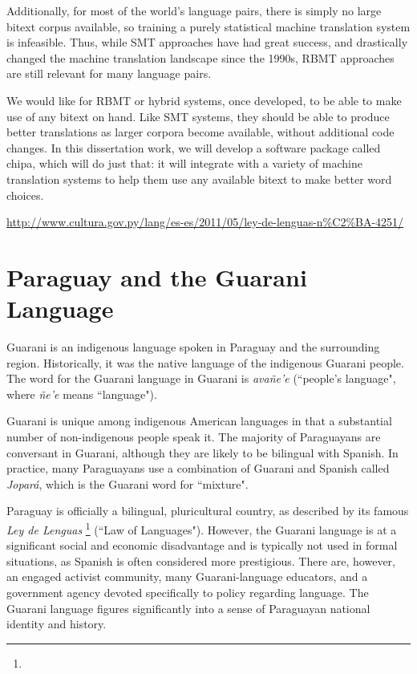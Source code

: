 Additionally, for most of the world's language pairs, there is simply no large
bitext corpus available, so training a purely statistical machine translation
system is infeasible.
Thus, while SMT approaches have had great success, and drastically changed the
machine translation landscape since the 1990s, RBMT approaches are still
relevant for many language pairs.

We would like for RBMT or hybrid systems, once developed, to be able to make
use of any bitext on hand.  Like SMT systems, they should be able to produce
better translations as larger corpora become available, without additional code
changes.
In this dissertation work, we will develop a software package called
chipa, which will do just that: %
it will integrate with a variety of machine translation systems to help them
use any available bitext to make better word choices.


\urldef{\leydelenguas}\url{http://www.cultura.gov.py/lang/es-es/2011/05/ley-de-lenguas-n%C2%BA-4251/}

\section{Paraguay and the Guarani Language}
Guarani is an indigenous language spoken in Paraguay and the surrounding
region.
Historically, it was the native language of the indigenous Guarani people. The
word for the Guarani language in Guarani is \emph{avañe'e} (``people's
language", where \emph{ñe'e} means ``language").

Guarani is unique among indigenous American languages in that a substantial
number of non-indigenous people speak it.  The majority of Paraguayans are
conversant in Guarani, although they are likely to be bilingual with Spanish.
In practice, many Paraguayans use a combination of Guarani and Spanish called
\emph{Jopar{\'a}}, which is the Guarani word for ``mixture".

Paraguay is officially a bilingual, pluricultural country, as described by its
famous \emph{Ley de Lenguas} \footnote{\leydelenguas} (``Law of Languages").
However, the Guarani language is at a significant social and economic
disadvantage and is typically not used in formal situations, as Spanish is
often considered more prestigious. There are, however, an engaged activist
community, many Guarani-language educators, and a government agency devoted
specifically to policy regarding language.
The Guarani language figures significantly into a sense of Paraguayan national
identity and history.

